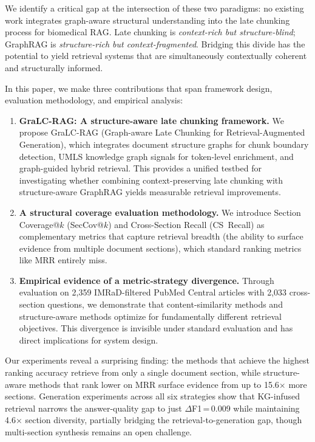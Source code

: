 \documentclass[sn-basic]{sn-jnl}
\newcommand{\gralcrag}{GraLC-RAG}
\begin{document}
We identify a critical gap at the intersection of these two paradigms: no existing work integrates graph-aware structural understanding into the late chunking process for biomedical RAG. Late chunking is \emph{context-rich but structure-blind}; GraphRAG is \emph{structure-rich but context-fragmented}. Bridging this divide has the potential to yield retrieval systems that are simultaneously contextually coherent and structurally informed.

In this paper, we make three contributions that span framework design, evaluation methodology, and empirical analysis:

\begin{enumerate}
  \item \textbf{\gralcrag{}: A structure-aware late chunking framework.} We propose \gralcrag{} (Graph-aware Late Chunking for Retrieval-Augmented Generation), which integrates document structure graphs for chunk boundary detection, UMLS knowledge graph signals for token-level enrichment, and graph-guided hybrid retrieval. This provides a unified testbed for investigating whether combining context-preserving late chunking with structure-aware GraphRAG yields measurable retrieval improvements.

  \item \textbf{A structural coverage evaluation methodology.} We introduce Section Coverage@$k$ (SecCov@$k$) and Cross-Section Recall (CS~Recall) as complementary metrics that capture retrieval breadth (the ability to surface evidence from multiple document sections), which standard ranking metrics like MRR entirely miss.

  \item \textbf{Empirical evidence of a metric-strategy divergence.} Through evaluation on 2{,}359 IMRaD-filtered PubMed Central articles with 2{,}033 cross-section questions, we demonstrate that content-similarity methods and structure-aware methods optimize for fundamentally different retrieval objectives. This divergence is invisible under standard evaluation and has direct implications for system design.
\end{enumerate}

Our experiments reveal a surprising finding: the methods that achieve the highest ranking accuracy retrieve from only a single document section, while structure-aware methods that rank lower on MRR surface evidence from up to 15.6$\times$ more sections. Generation experiments across all six strategies show that KG-infused retrieval narrows the answer-quality gap to just $\Delta$F1\,=\,0.009 while maintaining 4.6$\times$ section diversity, partially bridging the retrieval-to-generation gap, though multi-section synthesis remains an open challenge.
\end{document}

